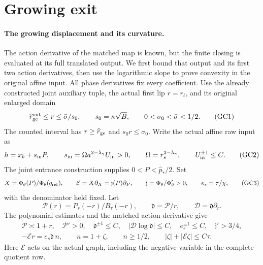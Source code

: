 \section{Growing exit}

\paragraph{The growing displacement and its curvature.}
The action derivative of the matched map is known, but the finite
closing is evaluated at its full translated output. We first bound that
output and its first two action derivatives, then use the logarithmic
slope to prove convexity in the original affine input.
All phase derivatives fix every coefficient. Use the already constructed
joint auxiliary tuple, the actual first lip $r=r_\ell$, and its original
enlarged domain
\[
 \widehat r_{\rm ge}^{\rm out}\le r\le\bar\sigma/s_0,\qquad
 s_0=\kappa\sqrt B,\qquad 0<\sigma_0<\bar\sigma<1/2 .
 \tag{GC1}
\]
The counted interval has $r\ge\widehat r_{\rm ge}$ and $s_0r\le\sigma_0$.
Write the actual affine raw input as
\[
 h=x_b+s_{\rm in}P,\qquad
 s_{\rm in}=\Omega a^{2-\lambda_\gamma}U_{\rm in}>0,\qquad
 \Omega=r_s^{2-\lambda_\gamma},\qquad U_{\rm in}^{\pm1}\le C .
 \tag{GC2}
\]
The joint entrance construction supplies $0<P<\widehat p_*/2$.
Set
\[
 X=\Phi_\theta(P)/\Phi_\theta(q_{\rm ref}),\qquad
 \mathcal E=X\partial_X=\mathfrak j(P)\partial_P,\qquad
 \mathfrak j=\Phi_\theta/\Phi_\theta'>0,\qquad
 e_s=\tau/\chi ,
 \tag{GC3}
\]
with the denominator held fixed. Let
\[
 \mathcal P(r)=P_s(-r)/B_\tau(-r),\qquad
 \mathfrak d=\mathcal P/r,\qquad \mathcal D=\mathfrak d\partial_r .
\]
The polynomial estimates and the matched action derivative give
\[
 \begin{gathered}
 \mathcal P\asymp1+r,\quad \mathcal P'>0,\quad
 \mathfrak d^{\pm1}\le C,\quad |\mathcal D\log\mathfrak d|\le C,
 \quad e_s^{\pm1}\le C,\quad \mathfrak j'>3/4,\\
 -\mathcal Er=e_s\mathfrak d\,n,\qquad n=1+\zeta,\qquad
 n\ge1/2,\qquad |\zeta|+|\mathcal E\zeta|\le C\tau .
 \end{gathered}
 \tag{GC4}
\]
Here $\mathcal E$ acts on the actual graph, including the negative
variable in the complete quotient row.

